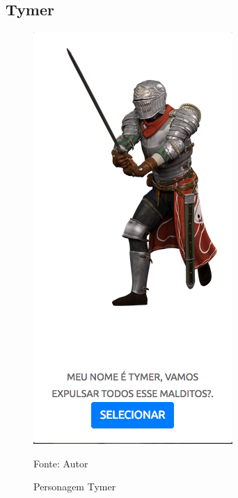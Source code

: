 \subsection{Tymer}
\begin{figure}[h]
	\centering
	\includegraphics[keepaspectratio=true,scale=0.5]{figuras/tymer.png}
	\caption{Personagem Tymer}
	Fonte: Autor
	\label{tymer}
\end{figure}


